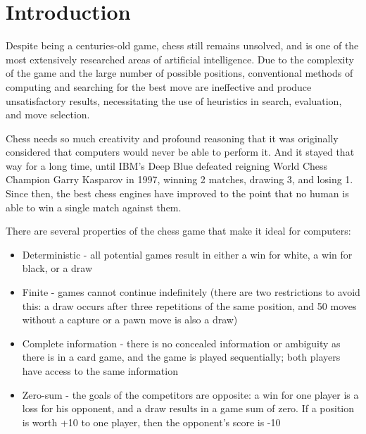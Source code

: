 \chapter{Introduction}
\label{intro}


Despite being a centuries-old game, chess still remains unsolved, and is one of the most extensively researched areas of artificial intelligence. Due to the complexity of the game and the large number of possible positions, conventional methods of computing and searching for the best move are ineffective and produce unsatisfactory results, necessitating the use of heuristics in search, evaluation, and move selection.

Chess needs so much creativity and profound reasoning that it was originally considered that computers would never be able to perform it. And it stayed that way for a long time, until IBM's Deep Blue \cite{campbell2002deep} defeated reigning World Chess Champion Garry Kasparov in 1997, winning 2 matches, drawing 3, and losing 1. Since then, the best chess engines have improved to the point that no human is able to win a single match against them.


There are several properties of the chess game that make it ideal for computers:
\begin{itemize}
    \item Deterministic - all potential games result in either a win for white, a win for black, or a draw
    \item Finite - games cannot continue indefinitely (there are two restrictions to avoid this: a draw occurs after three repetitions of the same position, and 50 moves without a capture or a pawn move is also a draw)
    \item Complete information - there is no concealed information or ambiguity as there is in a card game, and the game is played sequentially; both players have access to the same information
    \item Zero-sum - the goals of the competitors are opposite: a win for one player is a loss for his opponent, and a draw results in a game sum of zero. If a position is worth +10 to one player, then the opponent's score is -10
\end{itemize}

